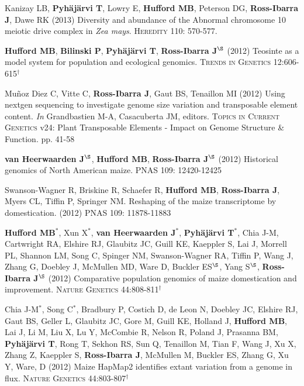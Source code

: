 \documentclass[letterpaper]{article}
\begin{document}
\begin{etaremune}
\item Kanizay LB, {\bf Pyh\"aj\"arvi T}, Lowry E, {\bf Hufford MB}, Peterson DG, {\bf Ross-Ibarra J}, Dawe RK (2013) Diversity and abundance of the Abnormal chromosome 10 meiotic drive complex in \emph{Zea mays}. \textsc{Heredity} 110: 570-577.

\item {\bf Hufford MB}, {\bf Bilinski P}, {\bf Pyh\"aj\"arvi T}, {\bf Ross-Ibarra J}$^\S$ (2012) Teosinte as a model system for population and ecological genomics. \textsc{Trends in Genetics} 12:606-615$^\dagger$

\item Mu\~{n}oz Diez C, Vitte C, {\bf Ross-Ibarra J}, Gaut BS, Tenaillon MI (2012) Using nextgen sequencing to investigate genome size variation and transposable element content. \emph{In} Grandbastien M-A, Casacuberta JM, editors. \textsc{Topics in Current Genetics} v24: Plant Transposable Elements - Impact on Genome Structure \& Function. pp. 41-58 

\item  {\bf van Heerwaarden J}$^\S$, {\bf Hufford MB}, {\bf Ross-Ibarra J}$^\S$ (2012) Historical genomics of North American maize. \textsc{PNAS} 109: 12420-12425

\item Swanson-Wagner R, Briskine R, Schaefer R, {\bf Hufford MB}, {\bf Ross-Ibarra J}, Myers CL, Tiffin P, Springer NM.  Reshaping of the maize transcriptome by domestication. (2012) \textsc{PNAS}  109: 11878-11883

\item {\bf Hufford MB}$^*$, Xun X$^*$, {\bf van Heerwaarden J}$^*$, {\bf Pyh\"aj\"arvi T}$^*$, Chia J-M, Cartwright RA, Elshire RJ, Glaubitz JC, Guill KE, Kaeppler S, Lai J, Morrell PL, Shannon LM, Song C, Spinger NM, Swanson-Wagner RA, Tiffin P, Wang J, Zhang G, Doebley J, McMullen MD, Ware D, Buckler ES$^\S$, Yang S$^\S$, {\bf Ross-Ibarra J}$^\S$ (2012) Comparative population genomics of maize domestication and improvement. \textsc{Nature Genetics} 44:808-811$^\dagger$

\item  Chia J-M$^*$, Song C$^*$, Bradbury P, Costich D, de Leon N, Doebley JC, Elshire RJ, Gaut BS, Geller L, Glaubitz JC, Gore M, Guill KE, Holland J,  {\bf Hufford MB}, Lai J, Li M, Liu X, Lu Y, McCombie R, Nelson R, Poland J, Prasanna BM,  {\bf Pyh\"aj\"arvi T}, Rong T, Sekhon RS,  Sun Q, Tenaillon M, Tian F, Wang J, Xu X, Zhang Z, Kaeppler S, {\bf Ross-Ibarra J}, McMullen M, Buckler ES, Zhang G, Xu Y, Ware, D (2012) Maize HapMap2 identifies extant variation from a genome in flux. \textsc{Nature Genetics} 44:803-807$^\dagger$


\end{etaremune}
\end{document}
